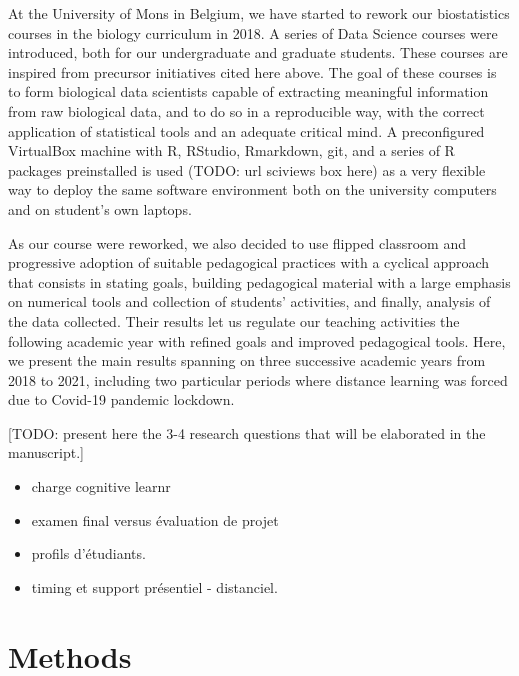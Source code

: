 \documentclass[
]{article}
\begin{document}
At the University of Mons in Belgium, we have started to rework our
biostatistics courses in the biology curriculum in 2018. A series of
Data Science courses were introduced, both for our undergraduate and
graduate students. These courses are inspired from precursor initiatives
cited here above. The goal of these courses is to form biological data
scientists capable of extracting meaningful information from raw
biological data, and to do so in a reproducible way, with the correct
application of statistical tools and an adequate critical mind. A
preconfigured VirtualBox machine with R, RStudio, Rmarkdown, git, and a
series of R packages preinstalled is used (TODO: url sciviews box here)
as a very flexible way to deploy the same software environment both on
the university computers and on student's own laptops.

As our course were reworked, we also decided to use flipped classroom
and progressive adoption of suitable pedagogical practices with a
cyclical approach that consists in stating goals, building pedagogical
material with a large emphasis on numerical tools and collection of
students' activities, and finally, analysis of the data collected. Their
results let us regulate our teaching activities the following academic
year with refined goals and improved pedagogical tools. Here, we present
the main results spanning on three successive academic years from 2018
to 2021, including two particular periods where distance learning was
forced due to Covid-19 pandemic lockdown.

{[}TODO: present here the 3-4 research questions that will be elaborated
in the manuscript.{]}

\begin{itemize}
\item
  charge cognitive learnr
\item
  examen final versus évaluation de projet
\item
  profils d'étudiants.
\item
  timing et support présentiel - distanciel.
\end{itemize}

\hypertarget{methods}{%
\section{Methods}\label{methods}}
\end{document}
